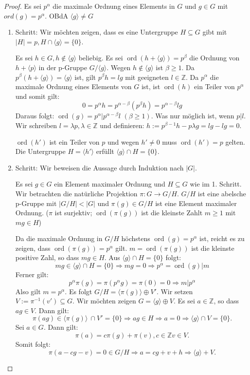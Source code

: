 \documentclass[12pt]{scrartcl} %
\DeclareMathOperator{\ord}{ord}
\theoremstyle{definition}
\theoremstyle{remark}
\begin{document}
\begin{proof}
Es sei $p^{\alpha}$ die maximale Ordnung eines Elements in $G$ und $g\in G$ mit $ord(g)=p^{\alpha}$. OBdA $\langle g\rangle \neq G$ 
\begin{enumerate}
\item Schritt: Wir möchten zeigen, dass es eine Untergruppe $H\subseteq G$ gibt mit $|H|=p, H\cap \langle g\rangle =\{ 0\}$.

Es sei $h \in G,h\notin \langle g \rangle$ beliebig.
Es sei $\ord(h+\langle g\rangle)=p^{\beta}$ die Ordnung von $h+\langle p\rangle$ in der p-Gruppe $G/\langle g\rangle$.
Wegen $h\notin \langle g\rangle$ ist $\beta\geq1$. 
Da $p^{\beta}(h+\langle g\rangle)=\langle g\rangle$ ist, gilt $p^{\beta}h=lg$ mit geeigneten $l\in \mathbb{Z}$. 
Da $p^{\alpha}$ die maximale Ordnung eines Elements von $G$ ist, ist $\ord(h)$ ein Teiler von $p^{\alpha}$ und somit gilt:
\[ 0=p^{\alpha}h=p^{\alpha -\beta}(p^{\beta}h)=p^{\alpha -\beta}lg\]
Daraus folgt: $ \ord(g)=p^{\alpha}|p^{\alpha -\beta}l$ $(\beta \geq 1)$. 
Was nur möglich ist, wenn $p|l$. 
Wir schreiben $l=\lambda p, \lambda \in \mathbb{Z}$ und definieren: $h:=p^{\beta -1}h-p\lambda g =lg-lg=0$.

$\ord(h')$ ist ein Teiler von $p$ und wegen $h'\neq 0$ muss $\ord(h')=p$ gelten. 
Die Untergruppe $H=\langle h'\rangle$ erfüllt $\langle g\rangle \cap H=\{ 0\}$.
\item Schritt: Wir beweisen die Aussage durch Induktion nach $|G|$.

Es sei $g\in G$ ein Element maximaler Ordnung und $H\subseteq G$ wie im 1. Schritt. 
Wir betrachten die natürliche Projektion $\pi :G\rightarrow G/H$. 
$G/H$ ist eine abelsche p-Gruppe mit $|G/H|<|G|$ und $\pi (g)\in G/H$ ist eine Element maximaler Ordnung.
($\pi$ ist surjektiv; $\ord(\pi (g))$ ist die kleinste Zahlt $m\geq 1$ mit $mg\in H$)

Da die maximale Ordnung in $G/H$ höchstens $\ord(g)=p^{\alpha}$ ist, reicht es zu zeigen, dass $\ord(\pi (g))=p^{\alpha}$ gilt.
$m=\ord(\pi (g))$ ist die kleinste positive Zahl, so dass $mg\in H$. Aus $\langle g\rangle \cap H=\{ 0\}$ folgt:
\[ mg\in \langle g\rangle \cap H=\{ 0\} \Rightarrow mg=0 \Rightarrow p^{\alpha}=\ord(g)|m\]
Ferner gilt:
\[ p^{\alpha}\pi (g)=\pi (p^{\alpha}g)=\pi(0) =0\Rightarrow m|p^{\alpha}\]
Also gilt $m=p^{\alpha}$. Es folgt $G/H=\langle \pi (g)\rangle \oplus V'$. 
Wir setzen $V := \pi ^{-1}(v') \subseteq G$. Wir möchten zeigen $G=\langle g\rangle \oplus V$. Es sei $a\in \mathbb{Z}$, so dass $ag\in V$. Dann gilt:
\[ \pi (ag)\in \langle \pi (g)\rangle\ \cap V'=\{ 0\}\Rightarrow ag\in H\Rightarrow a=0\Rightarrow \langle g\rangle \cap V=\{ 0\}.\]
Sei $a\in G$. Dann gilt:
\[ \pi (a)=c\pi (g)+\pi (v),c\in \mathbb{Z} v\in V.\]
Somit folgt:
\[ \pi (a-cg-v )=0\in G/H\Rightarrow a=cg+v+h\Rightarrow \langle g\rangle +V.\]
\qedhere
\end{enumerate} 
\end{proof}
\end{document}
